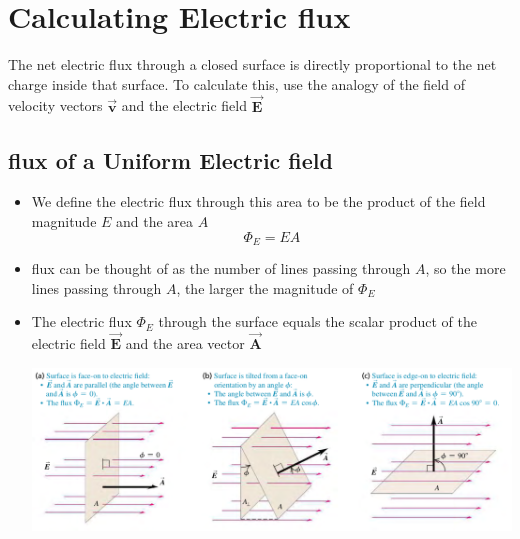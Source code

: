 \documentclass[11pt, a4paper]{article}
\begin{document}
\section[22.2, Calculating Electric flux]{Calculating Electric flux}
The net electric flux through a closed surface is directly proportional to the net charge
inside that surface. To calculate this, use the analogy of the field of velocity vectors
$\vec{\mathbf{v}}$ and the electric field $\vec{\mathbf{E}}$
\subsection{flux of a Uniform Electric field}
\begin{itemize}
    \item We define the electric flux through this area to be the product of the field
        magnitude $E$ and the area $A$
        \begin{equation}
            \Phi_E = EA
        \end{equation}
    \item flux can be thought of as the number of lines passing through $A$, so the more
        lines passing through $A$, the larger the magnitude of $\Phi_E$
    \item The electric flux $\Phi_E$ through the surface equals the scalar product of the
        electric field $\vec{\mathbf{E}}$ and the area vector $\vec{\mathbf{A}}$

\includegraphics[scale=0.65]{images/flat_surface_flux.png}


\end{itemize}
\end{document}
